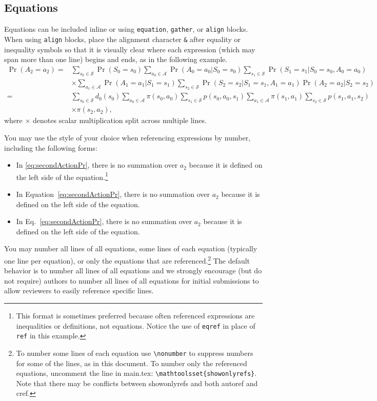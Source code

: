 \documentclass[10pt]{article} %
\theoremstyle{plain}
\theoremstyle{definition}
\theoremstyle{remark}
\begin{document}
\subsection{Equations}
\label{sec:equations}
Equations can be included inline or using \texttt{equation}, \texttt{gather}, or \texttt{align} blocks. When using \texttt{align} blocks, place the alignment character {\tt\&} after equality or inequality symbols so that it is visually clear where each expression (which may span more than one line) begins and ends, as in the following example. 
\begin{align}
    \nonumber\Pr(A_2=a_2) =& \sum_{s_0 \in \mathcal S} \Pr(S_0{=}s_0) \sum_{a_0 \in \mathcal A} \Pr(A_0{=}a_0|S_0{=}s_0) \sum_{s_1 \in \mathcal S} \Pr(S_1{=}s_1|S_0{=}s_0,A_0{=}a_0)\\
    \nonumber&\times \!\!\! \sum_{a_1 \in \mathcal A} \Pr(A_1{=}a_1|S_1{=}s_1)\sum_{s_2 \in \mathcal S}\Pr(S_2{=}s_2|S_1{=}s_1,A_1{=}a_1)\Pr(A_2{=}a_2|S_2{=}s_2)\\
    \label{eq:secondActionPr}
    \nonumber=&\sum_{s_0 \in \mathcal S} d_0(s_0) \sum_{a_0 \in \mathcal A} \pi(s_0,a_0)\sum_{s_1 \in \mathcal S} p(s_0,a_0,s_1) \sum_{a_1 \in \mathcal A} \pi(s_1,a_1) \sum_{s_2 \in \mathcal S}p(s_1,a_1,s_2)\\ 
    &\times\pi(s_2,a_2),
\end{align}
where $\times$ denotes scalar multiplication split across multiple lines. 

You may use the style of your choice when referencing expressions by number, including the following forms: 
\begin{itemize}
    \item In \eqref{eq:secondActionPr}, there is no summation over $a_2$ because it is defined on the left side of the equation.\footnote{This format is sometimes preferred because often referenced expressions are inequalities or definitions, not equations. Notice the use of \texttt{eqref} in place of \texttt{ref} in this example.}
    \item In Equation~\ref{eq:secondActionPr}, there is no summation over $a_2$ because it is defined on the left side of the equation.
    \item In Eq.~\ref{eq:secondActionPr}, there is no summation over $a_2$ because it is defined on the left side of the equation.
\end{itemize}
You may number all lines of all equations, some lines of each equation (typically one line per equation), or only the equations that are referenced.\footnote{To number some lines of each equation use \texttt{\textbackslash nonumber} to suppress numbers for some of the lines, as in this document. To number only the referenced equations, uncomment the line in main.tex: \texttt{\textbackslash mathtoolsset\{showonlyrefs\}}. Note that there may be conflicts between showonlyrefs and both autoref and cref.} 
%
The default behavior is to number all lines of all equations and we strongly encourage (but do not require) authors to number all lines of all equations for initial submissions to allow reviewers to easily reference specific lines.
\end{document}
